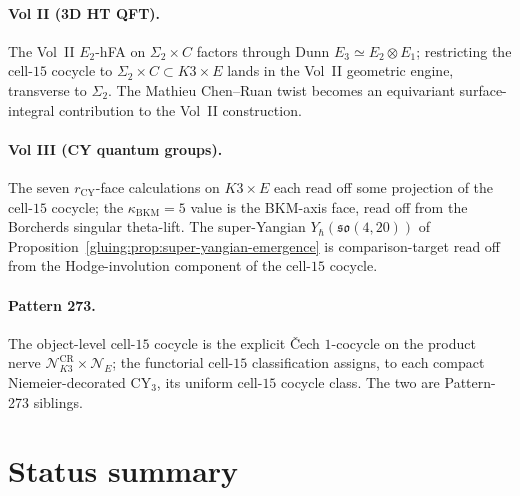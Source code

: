 \documentclass[11pt]{amsart}
\providecommand{\kBKM}{\kappa_{\mathrm{BKM}}}
\providecommand{\cN}{\mathcal{N}}
\providecommand{\fso}{\mathfrak{so}}
\begin{document}
\paragraph{Vol II (3D HT QFT).} The Vol~II $E_2$-hFA on $\Sigma_2 \times C$
factors through Dunn $E_3 \simeq E_2 \otimes E_1$; restricting the
cell-$15$ cocycle to $\Sigma_2 \times C \subset K3 \times E$ lands in
the Vol~II geometric engine, transverse to $\Sigma_2$. The Mathieu
Chen--Ruan twist becomes an equivariant surface-integral contribution
to the Vol~II construction.

\paragraph{Vol III (CY quantum groups).} The seven $r_{\mathrm{CY}}$-face
calculations on $K3 \times E$ each read off some projection of the
cell-$15$ cocycle; the $\kBKM = 5$ value is the BKM-axis face, read off
from the Borcherds singular theta-lift. The super-Yangian
$Y_\hbar(\fso(4, 20))$ of Proposition~\ref{gluing:prop:super-yangian-emergence}
is comparison-target read off from the Hodge-involution component of
the cell-$15$ cocycle.

\paragraph{Pattern 273.} The object-level cell-$15$ cocycle is the
explicit \v{C}ech $1$-cocycle on the product nerve
$\cN_{K3}^{\mathrm{CR}} \times \cN_E$; the functorial cell-$15$
classification assigns, to each compact Niemeier-decorated CY$_3$,
its uniform cell-$15$ cocycle class. The two are Pattern-273 siblings.

\section{Status summary}
\end{document}
